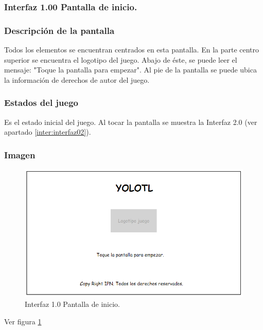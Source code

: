 	\subsubsection{Interfaz 1.00 Pantalla de inicio.} \label{inter:interfaz01}
	\subsubsection{Descripción de la pantalla}
Todos los elementos se encuentran centrados en esta pantalla. En la parte centro superior se encuentra el logotipo del juego. Abajo de éste, se puede leer el mensaje: "Toque la pantalla para empezar". Al pie de la pantalla se puede ubica la información de derechos de autor del juego.
	\subsubsection{Estados del juego}
Es el estado inicial del juego.
Al tocar la pantalla se muestra la Interfaz 2.0 (ver apartado \ref{inter:interfaz02}).
	\subsubsection{Imagen}
\begin{figure}
  \centering
   \includegraphics[width=0.6 \textwidth]{05TrabajoRealizado/01DocDiseno/Interfaz/imagenes/interfaz00}
  \caption{Interfaz 1.0 Pantalla de inicio.}
  \label{fig:PInicio}
\end{figure} 

Ver figura \ref{fig:PInicio}
